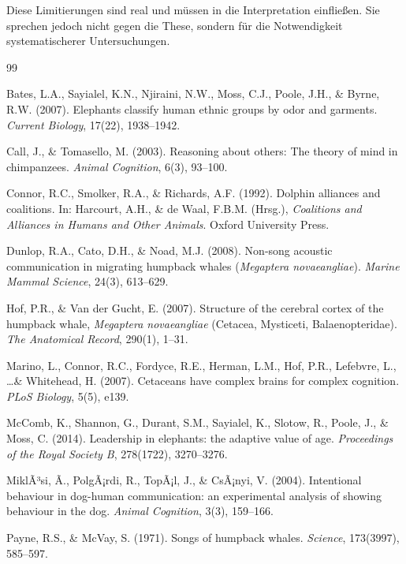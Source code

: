 ﻿\documentclass[12pt,a4paper]{article}
\theoremstyle{definition}
\theoremstyle{remark}
\begin{document}
Diese Limitierungen sind real und müssen in die Interpretation einfließen.
Sie sprechen jedoch nicht gegen die These, sondern für die Notwendigkeit
systematischerer Untersuchungen.

\begin{thebibliography}{99}

Bates, L.A., Sayialel, K.N., Njiraini, N.W., Moss, C.J., Poole, J.H., \& Byrne, R.W. (2007).
Elephants classify human ethnic groups by odor and garments.
\textit{Current Biology}, 17(22), 1938--1942.

Call, J., \& Tomasello, M. (2003).
Reasoning about others: The theory of mind in chimpanzees.
\textit{Animal Cognition}, 6(3), 93--100.

Connor, R.C., Smolker, R.A., \& Richards, A.F. (1992).
Dolphin alliances and coalitions.
In: Harcourt, A.H., \& de Waal, F.B.M. (Hrsg.), \textit{Coalitions and Alliances in Humans and Other Animals}.
Oxford University Press.

Dunlop, R.A., Cato, D.H., \& Noad, M.J. (2008).
Non-song acoustic communication in migrating humpback whales (\textit{Megaptera novaeangliae}).
\textit{Marine Mammal Science}, 24(3), 613--629.

Hof, P.R., \& Van der Gucht, E. (2007).
Structure of the cerebral cortex of the humpback whale, \textit{Megaptera novaeangliae} (Cetacea, Mysticeti, Balaenopteridae).
\textit{The Anatomical Record}, 290(1), 1--31.

Marino, L., Connor, R.C., Fordyce, R.E., Herman, L.M., Hof, P.R., Lefebvre, L., \ldots \& Whitehead, H. (2007).
Cetaceans have complex brains for complex cognition.
\textit{PLoS Biology}, 5(5), e139.

McComb, K., Shannon, G., Durant, S.M., Sayialel, K., Slotow, R., Poole, J., \& Moss, C. (2014).
Leadership in elephants: the adaptive value of age.
\textit{Proceedings of the Royal Society B}, 278(1722), 3270--3276.

MiklÃ³si, Ã., PolgÃ¡rdi, R., TopÃ¡l, J., \& CsÃ¡nyi, V. (2004).
Intentional behaviour in dog-human communication: an experimental analysis of showing behaviour in the dog.
\textit{Animal Cognition}, 3(3), 159--166.

Payne, R.S., \& McVay, S. (1971).
Songs of humpback whales.
\textit{Science}, 173(3997), 585--597.


\end{thebibliography}
\end{document}
